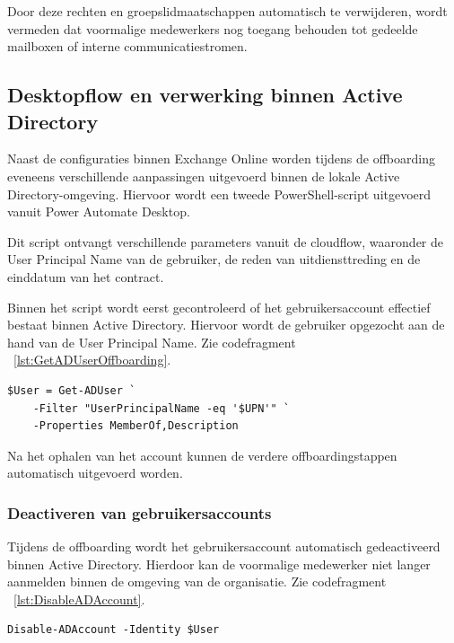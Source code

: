 Door deze rechten en groepslidmaatschappen automatisch te verwijderen, wordt vermeden dat voormalige medewerkers nog toegang behouden tot gedeelde mailboxen of interne communicatiestromen.

\subsection{Desktopflow en verwerking binnen Active Directory}

Naast de configuraties binnen Exchange Online worden tijdens de offboarding eveneens verschillende aanpassingen uitgevoerd binnen de lokale Active Directory-omgeving. Hiervoor wordt een tweede PowerShell-script uitgevoerd vanuit Power Automate Desktop.

Dit script ontvangt verschillende parameters vanuit de cloudflow, waaronder de User Principal Name van de gebruiker, de reden van uitdiensttreding en de einddatum van het contract.

Binnen het script wordt eerst gecontroleerd of het gebruikersaccount effectief bestaat binnen Active Directory. Hiervoor wordt de gebruiker opgezocht aan de hand van de User Principal Name. Zie codefragment ~\ref{lst:GetADUserOffboarding}.

\begin{listing}[ht]
\begin{verbatim}
$User = Get-ADUser `
    -Filter "UserPrincipalName -eq '$UPN'" `
    -Properties MemberOf,Description
\end{verbatim}
\caption{Opzoeken van de gebruiker}
\label{lst:GetADUserOffboarding}
\end{listing}

Na het ophalen van het account kunnen de verdere offboardingstappen automatisch uitgevoerd worden.

\subsubsection{Deactiveren van gebruikersaccounts}

Tijdens de offboarding wordt het gebruikersaccount automatisch gedeactiveerd binnen Active Directory. Hierdoor kan de voormalige medewerker niet langer aanmelden binnen de omgeving van de organisatie. Zie codefragment ~\ref{lst:DisableADAccount}.

\begin{listing}[ht]
\begin{verbatim}
Disable-ADAccount -Identity $User
\end{verbatim}
\caption{Deactiveren van gebruikersaccounts}
\label{lst:DisableADAccount}
\end{listing}

